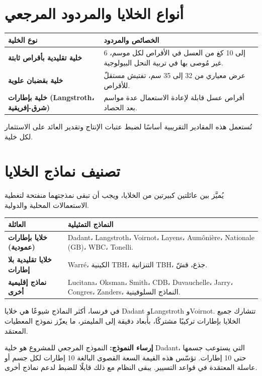 \section{أنواع الخلايا والمردود المرجعي}
\begin{xltabular}{\textwidth}{>{\bfseries}p{5.5cm} X}
\toprule
\textbf{نوع الخلية} & \textbf{الخصائص والمردود} \\
\midrule
\endhead
خلية تقليدية بأقراص ثابتة & 6 إلى 10 كغ من العسل في الأقراص لكل موسم، غير مُوصى بها في تربية النحل البيولوجية. \\
خلية بقضبان علوية & عرض معياري من 32 إلى 35 سم، تفتيش مستقلّ للأقراص. \\
خلية بإطارات (Langstroth، شرق-إفريقية) & أقراص عسل قابلة لإعادة الاستعمال عدة مواسم بعد الحصاد. \\
\bottomrule
\end{xltabular}
تُستعمل هذه المقادير التقريبية أساسًا لضبط عتبات الإنتاج وتقدير العائد على
الاستثمار لكل خلية.

\section{تصنيف نماذج الخلايا}
يُميَّز بين عائلتين كبيرتين من الخلايا، ويجب أن تبقى نمذجتهما منفتحة لتغطية
الاستعمالات المحلية والدولية.
\begin{xltabular}{\textwidth}{>{\bfseries}p{4.5cm} X}
\toprule
\textbf{العائلة} & \textbf{النماذج التمثيلية} \\
\midrule
\endhead
خلايا بإطارات (عمودية) & Dadant، Langstroth، Voirnot، Layens، Aumônière، Nationale (GB)، WBC، Tonelli. \\
خلايا تقليدية بلا إطارات & Warré، الكينية TBH، التنزانية TBH، جذع، قشّ. \\
نماذج إقليمية أخرى & Lucitana، Oksman، Smith، CDB، Duvauchelle، Jarry، Congres، Zanders، النماذج السلوفينية. \\
\bottomrule
\end{xltabular}
في فرنسا، أكثر النماذج شيوعًا هي خلايا Dadant وLangstroth وVoirnot. تتشارك جميع
الخلايا بإطارات تركيبًا مشتركًا، بأبعاد دقيقة إلى المليمتر، ما يعزّز نموذج
المعطيات المعتمَد.
\begin{encadre}
\textbf{إرساء النموذج:} النموذج المرجعي للمشروع هو خلية Dadant، التي يستوعب
جسمها حتى 10 إطارات. تؤسّس هذه القيمة السعة القصوى البالغة 10 إطارات لكل جسم أو
عاسلة المعتمَدة في قواعد التسيير. يبقى النظام مع ذلك قابلًا للضبط لدعم نماذج أخرى.
\end{encadre}

